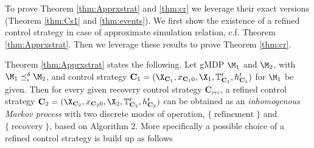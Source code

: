 \documentclass[letterpaper, 10 pt, conference]{amsart}
\theoremstyle{definition}
\theoremstyle{example}
\theoremstyle{remark}
\newcommand{\eps}{\epsilon}
\newcommand{\C}{{\mathbf{C}}}
\begin{document}
 
 
 
 
To prove Theorem \ref{thm:Apprxstrat} and \ref{thm:cr} we leverage their exact versions (Theorem \ref{thm:Cs1}
 and \ref{thm:events}).
 We first show the existence of a refined control strategy in case of approximate simulation relation, c.f. Theorem \ref{thm:Apprxstrat}.
 Then we leverage these results to prove Theorem  \ref{thm:cr}.
 
 Theorem \ref{thm:Apprxstrat} states the following.
Let gMDP $\M_1$ and $\M_2$, with $\M_1\preceq_\eps^\delta\M_2$, and control strategy $\C_1=(\X_{\C_1},x_{\C_10},\X_1,\mathbb T_{\C_1}^t,h_{\C_1}^t)$ for $ \M_1$ be given. 
Then for every given recovery control strategy $\C_{rec}$, 
a refined control strategy $\C_2=(\X_{\C_2},x_{\C_20},\X_2,\mathbb T_{\C_2}^t,h_{\C_2}^t)$ can be obtained as an \emph{inhomogenous Markov process} with two discrete modes of operation,  
$\{\operatorname{refinement}\}$ and $\{\operatorname{recovery}\}$, based on Algorithm 2. 
More specifically a possible choice of a refined control strategy is build up as follows
\end{document}
